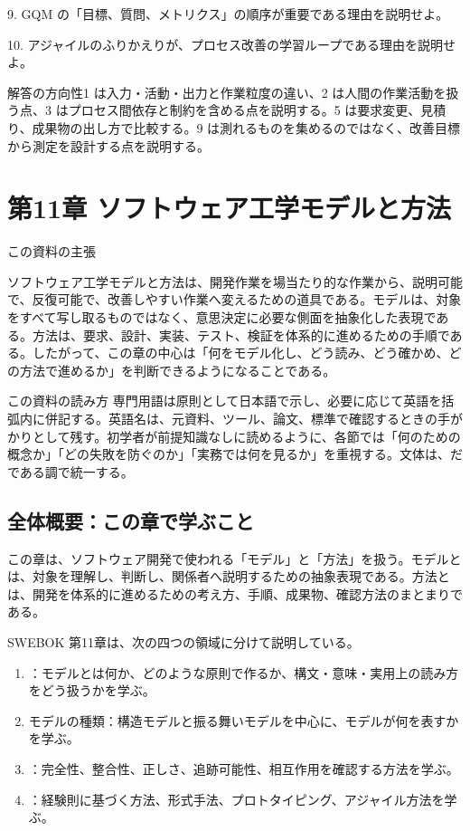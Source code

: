 \documentclass[a4paper,11pt]{ltjsarticle}
\numberwithin{figure}{section}
\numberwithin{table}{section}
\begin{document}
9. GQM の「目標、質問、メトリクス」の順序が重要である理由を説明せよ。

10. アジャイルのふりかえりが、プロセス改善の学習ループである理由を説明せよ。

\begin{pointbox}{解答の方向性}1 は入力・活動・出力と作業粒度の違い、2 は人間の作業活動を扱う点、3 はプロセス間依存と制約を含める点を説明する。5 は要求変更、見積り、成果物の出し方で比較する。9 は測れるものを集めるのではなく、改善目標から測定を設計する点を説明する。\end{pointbox}

\section{第11章 ソフトウェア工学モデルと方法}
\noindent この資料の主張\par
ソフトウェア工学モデルと方法は、開発作業を場当たり的な作業から、説明可能で、反復可能で、改善しやすい作業へ変えるための道具である。モデルは、対象をすべて写し取るものではなく、意思決定に必要な側面を抽象化した表現である。方法は、要求、設計、実装、テスト、検証を体系的に進めるための手順である。したがって、この章の中心は「何をモデル化し、どう読み、どう確かめ、どの方法で進めるか」を判断できるようになることである。

\begin{pointbox}{この資料の読み方}
専門用語は原則として日本語で示し、必要に応じて英語を括弧内に併記する。英語名は、元資料、ツール、論文、標準で確認するときの手がかりとして残す。初学者が前提知識なしに読めるように、各節では「何のための概念か」「どの失敗を防ぐのか」「実務では何を見るか」を重視する。文体は、だである調で統一する。
\end{pointbox}



\subsection*{全体概要：この章で学ぶこと}
この章は、ソフトウェア開発で使われる「モデル」と「方法」を扱う。モデルとは、対象を理解し、判断し、関係者へ説明するための抽象表現である。方法とは、開発を体系的に進めるための考え方、手順、成果物、確認方法のまとまりである。

SWEBOK 第11章は、次の四つの領域に分けて説明している。
\begin{enumerate}
  \item {}：モデルとは何か、どのような原則で作るか、構文・意味・実用上の読み方をどう扱うかを学ぶ。
  \item モデルの種類：構造モデルと振る舞いモデルを中心に、モデルが何を表すかを学ぶ。
  \item {}：完全性、整合性、正しさ、追跡可能性、相互作用を確認する方法を学ぶ。
  \item {}：経験則に基づく方法、形式手法、プロトタイピング、アジャイル方法を学ぶ。
\end{enumerate}
\end{document}
